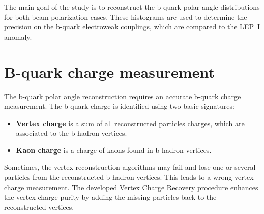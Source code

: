 The main goal of the study is to reconstruct the b-quark polar angle distributions for both beam polarization cases. 
These histograms are used to determine the precision on the b-quark electroweak couplings, which are compared to the LEP~I anomaly. 


\color{DarkSlateGray} %

\section*{B-quark charge measurement}
{\color{Blue}
The b-quark polar angle reconstruction requires an accurate b-quark charge measurement. 
The b-quark charge is identified using two basic signatures:
\begin{itemize}
	\item \textbf{Vertex charge} is a sum of all reconstructed particles charges, which are associated to the b-hadron vertices. 
	\item \textbf{Kaon charge} is a charge of kaons found in b-hadron vertices. 
\end{itemize}
}

Sometimes, the vertex reconstruction algorithms may fail and lose one or several particles from the reconstructed b-hadron vertices. This leads to a wrong vertex charge measurement. 
The developed Vertex Charge Recovery procedure enhances the vertex charge purity by adding the missing particles back to the reconstructed vertices. 


